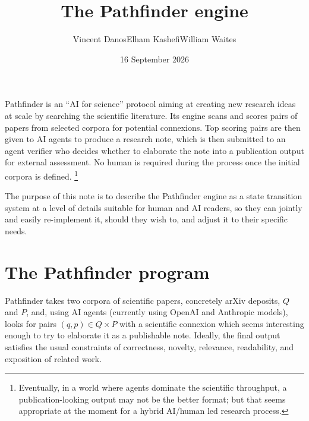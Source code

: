 \documentclass[11pt,a4paper]{article}
\title{The Pathfinder engine}
\author{Vincent Danos\sref{1}\quad Elham Kashefi\sref{2,3}\quad William Waites\sref{3}}
\date{16 September 2026}
\makeatletter
\newcommand{\headfont}{\sffamily\bfseries\hyphenpenalty=10000\exhyphenpenalty=10000}
\renewcommand{\maketitle}{%
  \thispagestyle{plain}%
  \begingroup\raggedright
  \vspace*{6mm}%
  {\sffamily\footnotesize\bfseries\color{accent}\MakeUppercase{\pf@kicker}\par}%
  \vspace{3mm}%
  {\headfont\fontsize{26}{30}\selectfont\color{ink}\@title\par}%
  \vspace{2.5mm}%
  {\ttfamily\small\color{accent}\href{https://\pf@repo}{\pf@repo}\par}%
  \vspace{7mm}%
  {\large\@author\par}%
  \vspace{1.5mm}%
  {\small\color{muted}\pf@affil\par}%
  \vspace{1.5mm}%
  {\small\color{muted}\@date\par}%
  \endgroup
  \vspace{9mm}}
\renewenvironment{abstract}
  {\par\noindent{\color{accent}\rule{\linewidth}{0.5pt}}\par\vspace{0.6\baselineskip}%
   \noindent{\headfont\small\color{accentdark}Abstract}\par\vspace{0.3\baselineskip}%
   \small\setlength{\parindent}{0pt}\setlength{\parskip}{0.5\baselineskip}}
  {\par\vspace{0.4\baselineskip}\noindent{\color{accent}\rule{\linewidth}{0.5pt}}\par}
\makeatother
\begin{document}
\maketitle

\begin{abstract}
Pathfinder is an ``AI for science'' protocol aiming at creating new
research ideas at scale by searching the
scientific literature. Its engine scans and scores pairs of papers from selected
corpora for potential connexions. Top scoring pairs are then given to AI agents
to produce a research note, which is then submitted to an agent verifier who
decides whether to elaborate the note into a publication output for external
assessment. No human is required during the process once the initial corpora is
defined.%
\footnote{Eventually, in a world where agents dominate the scientific
throughput, a publication-looking output may not be the better format; but that
seems appropriate at the moment for a hybrid AI/human led research process.}

The purpose of this note is to describe the Pathfinder engine as a state
transition system at a level of details suitable for human and AI readers, so
they can jointly and easily re-implement it, should they wish to, and adjust it
to their specific needs.
\end{abstract}

\section{The Pathfinder program}
Pathfinder takes two corpora of scientific papers, concretely arXiv deposits,
\(Q\) and \(P\), and, using AI agents (currently using OpenAI and Anthropic
models), looks for pairs \((q,p)\in Q\times P\) with a scientific
connexion which seems interesting enough to try to elaborate it as a publishable note.
Ideally, the final output satisfies the usual constraints of correctness, novelty,
relevance, readability, and exposition of related work.

\end{document}
